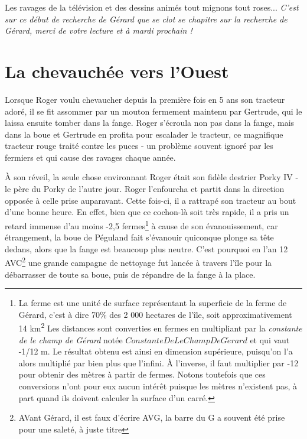 \documentclass[a5paper, 10pt, twoside]{book}
\begin{document}
Les ravages de la télévision et des dessins animés tout mignons tout roses...
\vfill
\emph{C'est sur ce début de recherche de Gérard que se clot se chapitre sur la recherche de Gérard, merci de votre lecture et à mardi prochain !}

\chapter{La chevauchée vers l'Ouest}
Lorsque Roger voulu chevaucher depuis la première fois en 5 ans son tracteur adoré, il se fit assommer par un mouton fermement maintenu par Gertrude, qui le laissa ensuite tomber dans la fange. Roger s'écroula non pas dans la fange, mais dans la boue et Gertrude en profita pour escalader le tracteur, ce magnifique tracteur rouge traité contre les puces - un problème souvent ignoré par les fermiers et qui cause des ravages chaque année.

À son réveil, la seule chose environnant Roger était son fidèle destrier Porky IV - le père du Porky de l'autre jour. Roger l'enfourcha et partit dans la direction opposée à celle prise auparavant. Cette fois-ci, il a rattrapé son tracteur au bout d'une bonne heure. En effet, bien que ce cochon-là soit très rapide, il a pris un retard immense d'au moins -2,5 fermes\footnote{La ferme est une unité de surface représentant la superficie de la ferme de Gérard, c'est à dire 70\% des 2 000 hectares de l'île, soit approximativement 14 km\textsuperscript{2} Les distances sont converties en fermes en multipliant par la \emph{constante de le champ de Gérard} notée $ConstanteDeLeChampDeG\acute{e}rard$ et qui vaut -1/12 m. Le résultat obtenu est ainsi en dimension supérieure, puisqu'on l'a alors multiplié par bien plus que l'infini. À l'inverse, il faut multiplier par -12 pour obtenir des mètres à partir de fermes. Notons toutefois que ces conversions n'ont pour eux aucun intérêt puisque les mètres n'existent pas, à part quand ils doivent calculer la surface d'un carré.} à cause de son évanouissement, car étrangement, la boue de Péguland fait s'évanouir quiconque plonge sa tête dedans, alors que la fange est beaucoup plus neutre. C'est pourquoi en l'an 12 AVC\footnote{AVant Gérard, il est faux d'écrire AVG, la barre du G a souvent été prise pour une saleté, à juste titre} une grande campagne de nettoyage fut lancée à travers l'île pour la débarrasser de toute sa boue, puis de répandre de la fange à la place.
\end{document}
